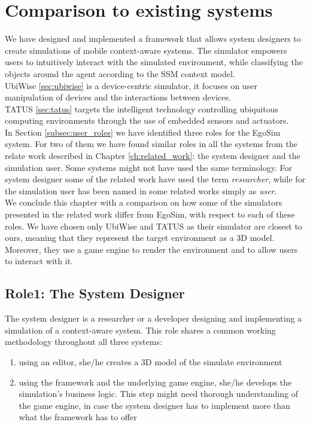 \section{Comparison to existing systems} %
\label{sec:eval_comparison}
We have designed and implemented a framework that allows system designers to create simulations of mobile context-aware systems. The simulator empowers users to intuitively interact with the simulated environment, while classifying the objects around the agent according to the SSM context model.\\

UbiWise \ref{sec:ubiwise} is a device-centric simulator, it focuses on user manipulation of devices and the
interactions between devices.\\

TATUS \ref{sec:tatus} targets the intelligent technology controlling ubiquitous computing environments through the use of embedded sensors and actuators.\\

In Section \ref{subsec:user_roles} we have identified three roles for the EgoSim system. For two of them we have found similar roles in all the systems from the relate work described in Chapter \ref{ch:related_work}: the system designer and the simulation user. Some systems might not have used the same terminology. For system designer some of the related work have used the term \emph{researcher}, while for the simulation user has been named in some related works simply as \emph{user}.\\

We conclude this chapter with a comparison on how some of the simulators presented in the related work differ from EgoSim, with respect to each of these roles. We have chosen only UbiWise and TATUS as their simulator are closest to ours, meaning that they represent the target environment as a 3D model. Moreover, they use a game engine to render the environment and to allow users to interact with it.

\subsection{Role1: The System Designer} %
\label{subsec:eval_role_system_designer}
The system designer is a researcher or a developer designing and implementing a simulation of a context-aware system. This role shares a common working methodology throughout all three systems:
\begin{enumerate}
	\item using an editor, she/he creates a 3D model of the simulate environment
	\item using the framework and the underlying game engine, she/he develops the simulation's business logic. This step might need thorough understanding of the game engine, in case the system designer has to implement more than what the framework has to offer
\end{enumerate}

